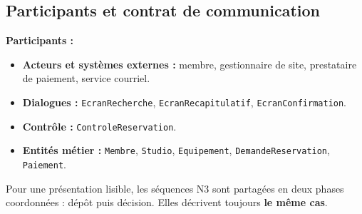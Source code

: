 \documentclass[10pt,a4paper]{article}
\begin{document}
\subsection{Participants et contrat de communication}
\textbf{Participants :}
\begin{itemize}
\item \textbf{Acteurs et systèmes externes :} membre, gestionnaire de site, prestataire de paiement, service courriel.
\item \textbf{Dialogues :} \texttt{EcranRecherche}, \texttt{EcranRecapitulatif}, \texttt{EcranConfirmation}.
\item \textbf{Contrôle :} \texttt{ControleReservation}.
\item \textbf{Entités métier :} \texttt{Membre}, \texttt{Studio}, \texttt{Equipement}, \texttt{DemandeReservation}, \texttt{Paiement}.
\end{itemize}
Pour une présentation lisible, les séquences N3 sont partagées en deux phases coordonnées : dépôt puis décision. Elles décrivent toujours \textbf{le même cas}.
\end{document}
